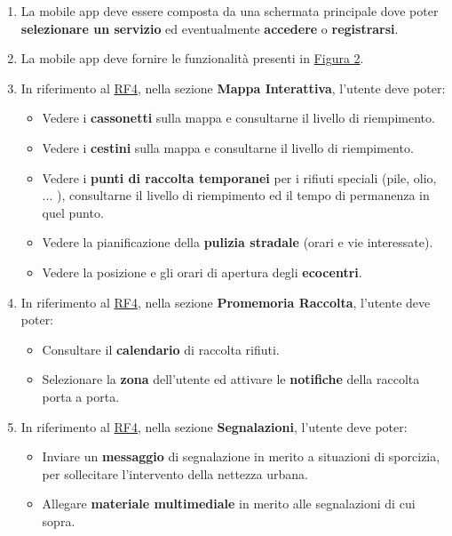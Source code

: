 \begin{enumerate}[start=3,label=\textbf{RF\theenumi}, labelwidth=4em, left=0pt, labelsep=1em, align=left]
    
    \item \label{itm:RF3} La mobile app deve essere composta da una schermata principale dove poter \textbf{selezionare un servizio} ed eventualmente \textbf{accedere} o \textbf{registrarsi}.
    
    \item \label{itm:RF4} La mobile app  deve fornire le funzionalità presenti in \hyperref[fig:mobileapp]{Figura 2}.
    
    \item \label{itm:RF5}   In riferimento al \hyperref[itm:RF4]{RF4}, nella sezione \textbf{Mappa Interattiva}, l'utente deve poter:
    \begin{itemize}
        \item Vedere i \textbf{cassonetti} sulla mappa e consultarne il livello di riempimento.
        \item Vedere i \textbf{cestini} sulla mappa e consultarne il livello di riempimento.
        \item Vedere i \textbf{punti di raccolta temporanei} per i rifiuti speciali (pile, olio, ... ), consultarne il livello di riempimento ed il tempo di permanenza in quel punto.
        \item Vedere la pianificazione della \textbf{pulizia stradale} (orari e vie interessate).
        \item Vedere la posizione e gli orari di apertura degli \textbf{ecocentri}.
    \end{itemize}
    
    \item \label{itm:RF6}   In riferimento al \hyperref[itm:RF4]{RF4}, nella sezione \textbf{Promemoria Raccolta}, l'utente deve poter:
    \begin{itemize}
        \item Consultare il \textbf{calendario} di raccolta rifiuti.
        \item Selezionare la \textbf{zona} dell'utente ed attivare le \textbf{notifiche} della raccolta porta a porta.
    \end{itemize}
    
    \item \label{itm:RF7}   In riferimento al \hyperref[itm:RF4]{RF4}, nella sezione \textbf{Segnalazioni}, l'utente deve poter:
    \begin{itemize}
        \item Inviare un \textbf{messaggio} di segnalazione in merito a situazioni di sporcizia, per sollecitare l'intervento della nettezza urbana.
        \item Allegare \textbf{materiale multimediale} in merito alle segnalazioni di cui sopra.
    \end{itemize}
        

\end{enumerate}
